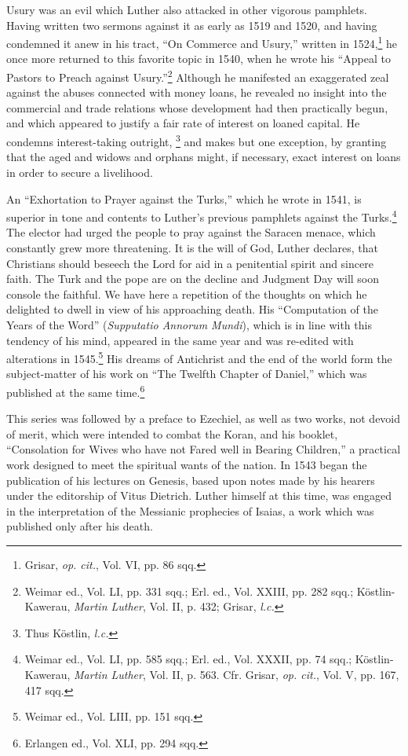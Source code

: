 Usury was an evil which Luther also attacked in other vigorous
pamphlets. Having written two sermons against it as early as 1519
and 1520, and having condemned it anew in his tract, “On Commerce
and Usury,” written in 1524,\footnote{Grisar, \textit{op. cit.}, Vol. VI, pp. 86 sqq.}
he once more returned to this
favorite topic in 1540, when he wrote his “Appeal to Pastors to
Preach against Usury.”\footnote
{Weimar ed., Vol. LI, pp. 331 sqq.; Erl. ed., Vol. XXIII, pp. 282 sqq.; Köstlin-Kawerau,
\textit{Martin Luther}, Vol. II, p. 432; Grisar, \textit{l.c.}}
Although he manifested an exaggerated
zeal against the abuses connected with money loans, he revealed no
insight into the commercial and trade relations whose development
had then practically begun, and which appeared to justify a fair rate
of interest on loaned capital. He condemns interest-taking outright,
\footnote{Thus Köstlin, \textit{l.c.}}
and makes but one exception, by granting that the aged and widows
and orphans might, if necessary, exact interest on loans in order to
secure a livelihood.

An “Exhortation to Prayer against the Turks,” which he wrote in
1541, is superior in tone and contents to Luther’s previous pamphlets
against the Turks.\footnote
{Weimar ed., Vol. LI, pp. 585 sqq.; Erl. ed., Vol. XXXII, pp. 74 sqq.; Köstlin-Kawerau,
\textit{Martin Luther}, Vol. II, p. 563. Cfr. Grisar, \textit{op. cit.}, Vol. V, pp. 167, 417 sqq.}
The elector had urged the people to pray against
the Saracen menace, which constantly grew more threatening. It is
the will of God, Luther declares, that Christians should beseech the
Lord for aid in a penitential spirit and sincere faith. The Turk and the
pope are on the decline and Judgment Day will soon console the faithful.
We have here a repetition of the thoughts on which he delighted
to dwell in view of his approaching death. His “Computation of the
Years of the Word” (\textit{Supputatio Annorum Mundi}), which is in line
with this tendency of his mind, appeared in the same year and was
re-edited with alterations in 1545.\footnote{Weimar ed., Vol. LIII, pp. 151 sqq.}
His dreams of Antichrist and the
end of the world form the subject-matter of his work on “The
Twelfth Chapter of Daniel,” which was published at the same time.\footnote{Erlangen ed., Vol. XLI, pp. 294 sqq.}

This series was followed by a preface to Ezechiel, as well as two
works, not devoid of merit, which were intended to combat the
Koran, and his booklet, “Consolation for Wives who have not Fared
well in Bearing Children,” a practical work designed to meet the
spiritual wants of the nation. In 1543 began the publication of his
lectures on Genesis, based upon notes made by his hearers under the
editorship of Vitus Dietrich. Luther himself at this time, was engaged
in the interpretation of the Messianic prophecies of Isaias, a work
which was published only after his death.

